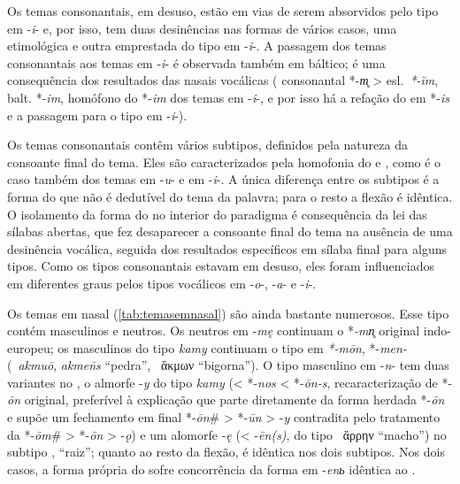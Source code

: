 Os temas consonantais, em desuso, estão em vias de serem absorvidos pelo
tipo em -\emph{i}- e, por isso, tem duas desinências nas formas de
vários casos, uma etimológica e outra emprestada do tipo em -\emph{i}-.
A passagem dos temas consonantais aos temas em -\emph{i}- é observada
também em báltico; é uma consequência dos resultados das nasais
vocálicas ( consonantal *-\emph{m̥} >
esl.~\emph{*-ĭm}, balt. *-\emph{im}, homófono do  *-\emph{im} dos temas
em -\emph{i}-, e por isso há a refação do  em *-\emph{is} e a
passagem para o tipo em -\emph{i}-).

Os temas consonantais contêm vários subtipos, definidos pela natureza da
consoante final do tema. Eles são caracterizados pela homofonia do
 e , como é o caso também dos temas em -\emph{u}- e em
-\emph{i}-. A única diferença entre os subtipos é a forma do  que
não é dedutível do tema da palavra; para o resto a flexão é idêntica. O
isolamento da forma do  no interior do paradigma é consequência da
lei das sílabas abertas, que fez desaparecer a consoante final do tema
na ausência de uma desinência vocálica, seguida dos resultados
específicos em sílaba final para alguns tipos. Como os tipos
consonantais estavam em desuso, eles foram influenciados em diferentes
graus pelos tipos vocálicos em -\emph{o}-, -\emph{a}- e -\emph{i}-.

Os temas em nasal (\autoref{tab:temasemnasal}) são ainda bastante numerosos.
Esse tipo contém masculinos e neutros.
Os neutros em -\emph{mę} continuam o
*\emph{-mn̥} original indo-europeu; os masculinos do tipo \emph{kamy}
continuam o tipo em \emph{*-mōn}, *-\emph{men-}
(~\emph{akmuō}, 
\emph{akmen̄s} ``pedra'', ~ἄκμων ``bigorna'').
O tipo masculino em
-\emph{n}- tem duas variantes no , o almorfe -\emph{y} do tipo
\emph{kamy} (< *-\emph{nos} < *-\emph{ōn-s},
recaracterização de *-\emph{ōn} original, preferível à explicação que
parte diretamente da forma herdada *-\emph{ōn} e supõe um fechamento em
final *-\emph{ōn}\# > *-\emph{ūn} > ­-\emph{y}
contradita pelo tratamento da  *-\emph{ōm}\# >
*-\emph{ōn} > -\emph{ǫ}) e um alomorfe -\emph{ę}
(< -\emph{ēn(s)}, do tipo ~ἄρρην ``macho'') no subtipo
,   ``raiz''; quanto ao resto
da flexão, é idêntica nos dois subtipos. Nos dois casos, a forma própria
do  sofre concorrência da forma em -\emph{enь} idêntica ao
.
\clearpage


